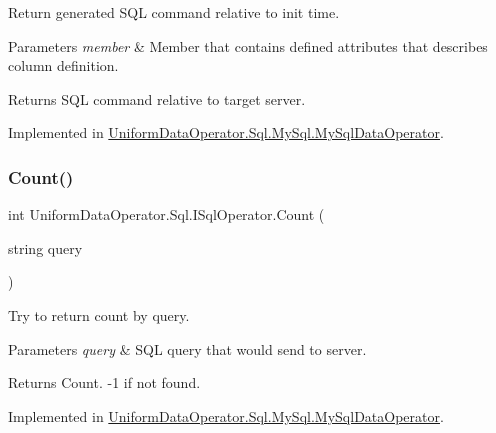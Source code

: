 Return generated S\+QL command relative to init time. 


\begin{DoxyParams}{Parameters}
{\em member} & Member that contains defined attributes that describes column definition.\\
\hline
\end{DoxyParams}
\begin{DoxyReturn}{Returns}
S\+QL command relative to target server.
\end{DoxyReturn}


Implemented in \mbox{\hyperlink{class_uniform_data_operator_1_1_sql_1_1_my_sql_1_1_my_sql_data_operator_a0bdc2943e5d10576fb564913cdd744e7}{Uniform\+Data\+Operator.\+Sql.\+My\+Sql.\+My\+Sql\+Data\+Operator}}.

\mbox{\label{interface_uniform_data_operator_1_1_sql_1_1_i_sql_operator_ad53cec492d507ed154f5535ce1db4e42}} 
\subsubsection{\texorpdfstring{Count()}{Count()}}
{\footnotesize\ttfamily int Uniform\+Data\+Operator.\+Sql.\+I\+Sql\+Operator.\+Count (\begin{DoxyParamCaption}\item[{string}]{query }\end{DoxyParamCaption})}



Try to return count by query. 


\begin{DoxyParams}{Parameters}
{\em query} & S\+QL query that would send to server.\\
\hline
\end{DoxyParams}
\begin{DoxyReturn}{Returns}
Count. -\/1 if not found.
\end{DoxyReturn}


Implemented in \mbox{\hyperlink{class_uniform_data_operator_1_1_sql_1_1_my_sql_1_1_my_sql_data_operator_acf051b5431ee10337b9ab6bc6184d4db}{Uniform\+Data\+Operator.\+Sql.\+My\+Sql.\+My\+Sql\+Data\+Operator}}.

